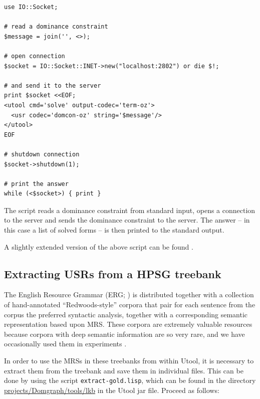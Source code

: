\begin{verbatim}
use IO::Socket;

# read a dominance constraint
$message = join('', <>);

# open connection
$socket = IO::Socket::INET->new("localhost:2802") or die $!;

# and send it to the server
print $socket <<EOF;
<utool cmd='solve' output-codec='term-oz'>
  <usr codec='domcon-oz' string='$message'/>
</utool>
EOF

# shutdown connection
$socket->shutdown(1);

# print the answer 
while (<$socket>) { print }
\end{verbatim}

The script reads a dominance constraint from standard input, opens a
connection to the server and sends the dominance constraint to the
server. The answer -- in this case a list of solved forms -- is then
printed to the standard output.

A slightly extended version of the above script can be found
.





\subsection{Extracting USRs from a HPSG treebank}
\label{sec:treebank}

The English Resource Grammar (ERG; )
is distributed together with a collection of hand-annotated
``Redwoods-style'' corpora that pair for each sentence from the corpus
the preferred syntactic analysis, together with a corresponding
semantic representation based upon MRS. These corpora are extremely
valuable resources because corpora with deep semantic information are
so very rare, and we have occasionally used them in experiments
\cite{FucKolNieTha04,FliKolTha05}.

In order to use the MRSs in these treebanks from within Utool, it is
necessary to extract them from the treebank and save them in
individual files. This can be done by using the script
\verb|extract-gold.lisp|, which can be found in the directory
\url{projects/Domgraph/tools/lkb} in the Utool jar file. Proceed as
follows:

